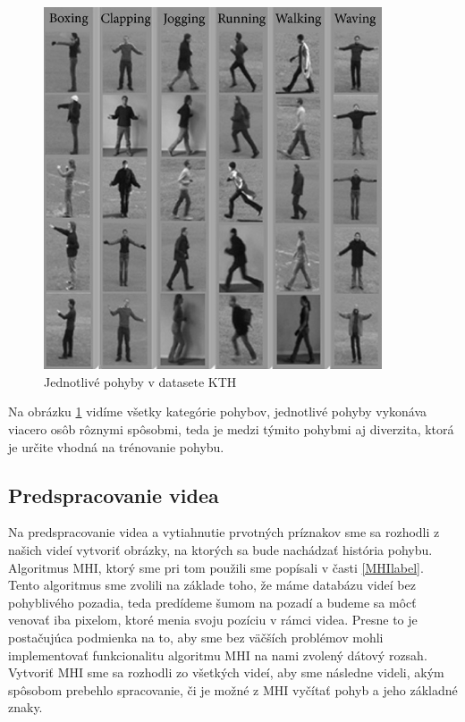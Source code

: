 \begin{figure}[H]
  \centering
  \includegraphics[width=10cm]{img/KTHdataset.png}
  \caption{Jednotlivé pohyby v datasete KTH \cite{c14}}
  \label{KTHobr}
\end{figure}

Na obrázku \ref{KTHobr} vidíme všetky kategórie pohybov, jednotlivé pohyby vykonáva viacero osôb rôznymi spôsobmi, teda je medzi týmito pohybmi aj diverzita, ktorá je určite vhodná na trénovanie pohybu. 

\subsection{Predspracovanie videa}
Na predspracovanie videa a vytiahnutie prvotných príznakov sme sa rozhodli z našich videí vytvoriť obrázky, na ktorých sa bude nachádzať história pohybu. Algoritmus MHI, ktorý sme pri tom použili sme popísali v časti \ref{MHIlabel}. Tento algoritmus sme zvolili na základe toho, že máme databázu videí bez pohyblivého pozadia, teda predídeme šumom na pozadí a budeme sa môcť venovať iba pixelom, ktoré menia svoju pozíciu v rámci videa. Presne to je postačujúca podmienka na to, aby sme bez väčších problémov mohli implementovať funkcionalitu algoritmu MHI na nami zvolený dátový rozsah. Vytvoriť MHI sme sa rozhodli zo všetkých videí, aby sme následne videli, akým spôsobom prebehlo spracovanie, či je možné z MHI vyčítať pohyb a jeho základné znaky. 

